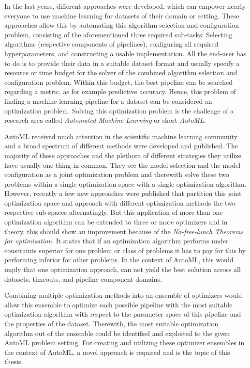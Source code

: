In the last years, different approaches were developed, which can empower nearly everyone to use machine learning for datasets of their domain or setting.
These approaches allow this by automating this algorithm selection and configuration problem, consisting of the aforementioned three required sub-tasks: Selecting algorithms (respective components of pipelines), configuring all required hyperparameters, and constructing a usable implementation.
All the end-user has to do is to provide their data in a suitable dataset format and usually specify a resource or time budget for the solver of the combined algorithm selection and configuration problem.\newline
Within this budget, the best pipeline can be searched regarding a metric, as for example predictive accuracy.
Hence, this problem of finding a machine learning pipeline for a dataset can be considered an optimization problem.
Solving this optimization problem is the challenge of a research area called \textit{Automated Machine Learning} or short \textit{AutoML}.

AutoML received much attention in the scientific machine learning community and a broad spectrum of different methods were developed and published.
The majority of these approaches and the plethora of different strategies they utilize have usually one thing in common.
They see the model selection and the model configuration as a joint optimization problem and therewith solve these two problems within a single optimization space with a single optimization algorithm.\newline
However, recently a few new approaches were published that partition this joint optimization space and approach with different optimization methods the two respective sub-spaces alternatingly.
But this application of more than one optimization algorithm can be extended to three or more optimizers and in theory, this should show an improvement because of the \textit{No-free-lunch Theorems for optimization}.
It states that if an optimization algorithm performs under constraints superior for one problem or class of problems it has to pay for this by performing inferior for other problems.
In the context of AutoML, this would imply that one optimization approach, can not yield the best solution across all datasets, timeouts, and pipeline component domains.

Combining multiple optimization methods into an ensemble of optimizers would allow this ensemble to optimize each possible pipeline with the most suitable optimization algorithm with respect to the parameter space of this pipeline and the properties of the dataset.
Therewith, the most suitable optimization algorithm out of the ensemble could be identified and exploited to the given AutoML problem setting.\newline
For creating and utilizing these optimizer ensembles in the context of AutoML, a novel approach is required and is the topic of this thesis. 

